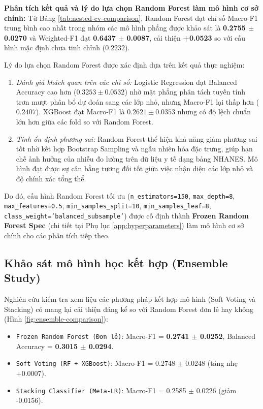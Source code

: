 

\textbf{Phân tích kết quả và lý do lựa chọn Random Forest làm mô hình cơ sở chính:}
Từ Bảng \ref{tab:nested-cv-comparison}, Random Forest đạt chỉ số Macro-F1 trung bình cao nhất trong nhóm các mô hình phẳng được khảo sát là \textbf{0.2755 $\pm$ 0.0270} và Weighted-F1 đạt \textbf{0.6437 $\pm$ 0.0087}, cải thiện \textbf{+0.0523} so với cấu hình mặc định chưa tinh chỉnh ($0.2232$).

Lý do lựa chọn Random Forest được xác định dựa trên kết quả thực nghiệm:
\begin{enumerate}
    \item \textit{Đánh giá khách quan trên các chỉ số:} Logistic Regression đạt Balanced Accuracy cao hơn ($0.3253 \pm 0.0532$) nhờ mặt phẳng phân tách tuyến tính trơn mượt phân bổ dự đoán sang các lớp nhỏ, nhưng Macro-F1 lại thấp hơn ($0.2407$). XGBoost đạt Macro-F1 là $0.2621 \pm 0.0353$ nhưng có độ lệch chuẩn lớn hơn giữa các fold so với Random Forest.
    \item \textit{Tính ổn định phương sai:} Random Forest thể hiện khả năng giảm phương sai tốt nhờ kết hợp Bootstrap Sampling và ngẫu nhiên hóa đặc trưng, giúp hạn chế ảnh hưởng của nhiễu đo lường trên dữ liệu y tế dạng bảng NHANES. Mô hình đạt được sự cân bằng tương đối tốt giữa việc nhận diện các lớp nhỏ và độ chính xác tổng thể.
\end{enumerate}

Do đó, cấu hình Random Forest tối ưu (\texttt{n\_estimators=150}, \texttt{max\_depth=8}, \texttt{max\_features=0.5}, \texttt{min\_samples\_split=10}, \texttt{min\_samples\_leaf=8}, \texttt{class\_weight='balanced\_subsample'}) được cố định thành \textbf{Frozen Random Forest Spec} (chi tiết tại Phụ lục \ref{app:hyperparameters}) làm mô hình cơ sở chính cho các phân tích tiếp theo.

\subsection{Khảo sát mô hình học kết hợp (Ensemble Study)}
Nghiên cứu kiểm tra xem liệu các phương pháp kết hợp mô hình (Soft Voting và Stacking) có mang lại cải thiện đáng kể so với Random Forest đơn lẻ hay không (Hình \ref{fig:ensemble-comparison}):
\begin{itemize}
    \item \texttt{Frozen Random Forest (Đơn lẻ)}: Macro-F1 = \textbf{0.2741 $\pm$ 0.0252}, Balanced Accuracy = \textbf{0.3015 $\pm$ 0.0294}.
    \item \texttt{Soft Voting (RF + XGBoost)}: Macro-F1 = 0.2748 $\pm$ 0.0248 (tăng nhẹ +0.0007).
    \item \texttt{Stacking Classifier (Meta-LR)}: Macro-F1 = 0.2585 $\pm$ 0.0226 (giảm -0.0156).
\end{itemize}

